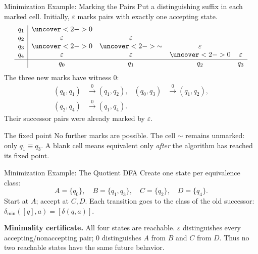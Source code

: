 \documentclass[10pt]{beamer}
\begin{document}
\begin{frame}{Minimization Example: Marking the Pairs}
  \small
  Put a distinguishing suffix in each marked cell. Initially, $\varepsilon$
  marks pairs with exactly one accepting state.
  \[
    \begin{array}{c|cccc}
      q_1 & \uncover<2->{0}\\
      q_2 & \varepsilon & \varepsilon\\
      q_3 & \uncover<2->{0} & \uncover<2->{\sim} & \varepsilon\\
      q_4 & \varepsilon & \varepsilon & \uncover<2->{0} & \varepsilon\\
      \hline
          & q_0 & q_1 & q_2 & q_3
    \end{array}
  \]
  \pause
  The three new marks have witness $0$:
  \[
    \begin{aligned}
      (q_0,q_1)&\xrightarrow{0}(q_1,q_2),&
      (q_0,q_3)&\xrightarrow{0}(q_1,q_2),\\
      (q_2,q_4)&\xrightarrow{0}(q_1,q_4).&&
    \end{aligned}
  \]
  Their successor pairs were already marked by $\varepsilon$.
  \begin{block}{The fixed point}
    No further marks are possible. The cell $\sim$ remains unmarked:
    only $q_1\equiv q_3$. A blank cell means equivalent only
    \emph{after} the algorithm has reached its fixed point.
  \end{block}
\end{frame}

\begin{frame}{Minimization Example: The Quotient DFA}
  \small
  Create one state per equivalence class:
  \[
    A=\{q_0\},\quad B=\{q_1,q_3\},\quad
    C=\{q_2\},\quad D=\{q_4\}.
  \]
  Start at $A$; accept at $C,D$. Each transition goes to the class of the
  old successor: $\delta_{\min}([q],a)=[\delta(q,a)]$.
  \begin{center}
  \end{center}
  \pause
  \textbf{Minimality certificate.} All four states are reachable.
  $\varepsilon$ distinguishes every accepting/nonaccepting pair;
  $0$ distinguishes $A$ from $B$ and $C$ from $D$.
  Thus no two reachable states have the same future behavior.
\end{frame}
\end{document}

